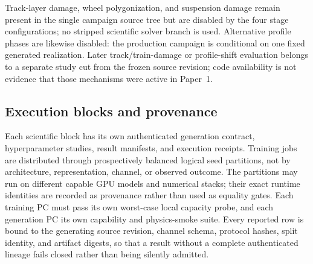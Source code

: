 Track-layer damage, wheel polygonization, and suspension damage remain present
in the single campaign source tree but are disabled by the four stage
configurations; no stripped scientific solver branch is used. Alternative
profile phases are likewise disabled: the production campaign is conditional
on one fixed generated realization. Later track/train-damage or profile-shift
evaluation belongs to a separate study cut from the frozen source revision;
code availability is not evidence that those mechanisms were active in
Paper~1.

\subsection{Execution blocks and provenance}
\label{sec:blocks}

Each scientific block has its own authenticated generation contract,
hyperparameter studies, result manifests, and execution receipts. Training jobs
are distributed through prospectively balanced logical seed partitions, not by
architecture, representation, channel, or observed outcome. The partitions may
run on different capable GPU models and numerical stacks; their exact runtime
identities are recorded as provenance rather than used as equality gates. Each
training PC must pass its own worst-case local capacity probe, and each
generation PC its own capability and physics-smoke suite. Every reported row is
bound to the generating source revision, channel schema, protocol hashes, split
identity, and artifact digests, so that a result without a complete
authenticated lineage fails closed rather than being silently admitted.
